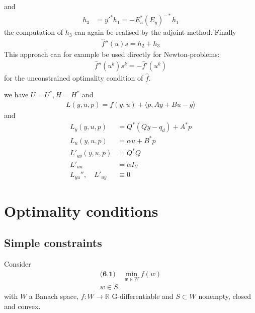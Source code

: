 and 
\begin{align*}
		h_3 &= y'^* h_1 = -E_u^* (E_y)^{-*} h_1
\end{align*}
the computation of $h_3$ can again be realised by the adjoint method. Finally
\begin{align*}
	\hat{f}''(u)s = h_2 + h_3
\end{align*}
This approach can for example be used directly for Newton-problems:
\begin{align*}
	\hat{f}''(u^k) s^k = - \hat{f}'(u^k)
\end{align*}
for the unconstrained optimality condition of $\hat{f}$. 

\begin{example}
	we have $U = U^*, H = H^*$ and 
	\begin{align*}
		L(y, u, p) = f(y, u) + \langle p, Ay + Bu - g \rangle
	\end{align*}
	and 
	\begin{align*}
		L_y(y, u, p) &= Q^*(Qy - q_d) + A^* p\\
		L_u(y, u, p) &= \alpha u + B^* p\\
		L'_{yy}(y, u, p) &= Q^* Q \\
		L'_{uu} &= \alpha I_U\\
				L_{yu}'' ,\quad L'_{uy} &\equiv 0
	\end{align*}
\end{example}



\section{Optimality conditions}
\subsection{Simple constraints}
Consider 
\begin{align*}\textbf{(6.1)}\quad
	\min_{w \in W} f(w) \\
	w \in S
\end{align*}
with $W$ a Banach space, $f: W \rightarrow \mathbb{R}$ G-differentiable and $S \subset W$ nonempty, closed and convex.


